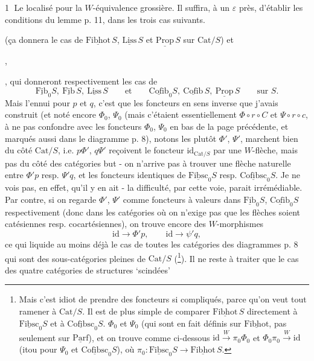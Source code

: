 \documentclass[11pt]{article}
\newcommand{\printedpage}[1]{\marginpar{\footnotesize p.~#1}}
\newcommand{\msp}[1]{\marginpar{\footnotesize [#1]}}
\newcommand{\Cat}{\mathrm{Cat}}
\newcommand{\uc}[1]{\underline{\mathrm{#1}}}
\begin{document}
\textcircled{1} Le localisé pour la $W$-équivalence grossière. Il suffira, à un $\varepsilon$ près, d'établir les conditions du lemme p. 11, dans les trois cas suivants.
(ça donnera le cas de $\uc{Fibhot}\,S$, $\uc{Liss}\,S$ et $\uc{Prop}\,S$ sur $\Cat/S$) et
,
,
qui donneront respectivement les cas de
\[
\uc{Fib}_0S,\ \uc{Fib}\,S,\ \uc{Liss}\,S \qquad \text{et} \qquad \uc{Cofib}_0S,\ \uc{Cofib}\,S,\ \uc{Prop}\,S \qquad \text{sur } S.
\]
Mais l'ennui pour $p$ et $q$, c'est que les foncteurs en sens inverse que j'avais construit (et noté encore $\Phi_0$, $\Psi_0$ (mais c'étaient essentiellement $\Phi\circ r\circ C$ et $\Psi\circ r\circ c$, à ne pas confondre avec les foncteurs $\Phi_0$, $\Psi_0$ en bas de la page précédente, et marqués aussi dans le diagramme p. 8), notons les plutôt $\Phi'$, $\Psi'$, marchent bien du côté $\Cat/S$, i.e. $p\Phi'$, $q\Psi'$ reçoivent le foncteur $\mathrm{id}_{\Cat/S}$ par une $W$-flèche, mais pas du côté des catégories but - on n'arrive pas à trouver une flèche naturelle entre $\Phi'p$ resp. $\Psi'q$, et les foncteurs identiques de $\uc{Fibsc}_0S$ resp. $\uc{Cofibsc}_0S$. Je ne vois
\msp{page 53}
pas, en effet, qu'il y en ait - la difficulté, par cette voie, parait irrémédiable. Par contre, si on regarde $\Phi'$, $\Psi'$ comme foncteurs à valeurs dans $\uc{Fib}_0S$, $\uc{Cofib}_0S$ respectivement (donc dans les catégories où on n'exige pas que les flèches soient catésiennes resp. cocartésiennes), on trouve encore des $W$-morphismes %
\[
\mathrm{id} \longrightarrow \Phi'p, \qquad \mathrm{id} \longrightarrow \psi'q, %
\]
ce qui liquide au moins déjà le cas de toutes les catégories des diagrammes p. 8 qui sont des
\printedpage{33}
sous-catégories pleines de $\Cat/S$ (\footnote[36]{Mais c'est idiot de prendre des foncteurs si compliqués, parce qu'on veut tout ramener à $\Cat/S$. Il est de plus simple de comparer $\uc{Fibhot}\,S$ directement à $\uc{Fibsc}_0S$ et à $\uc{Cofibsc}_0S$. $\Phi_0$ et $\Psi_0$ (qui sont en fait définis sur $\uc{Fibhot}$, pas seulement sur $\uc{Parf}$), et on trouve comme ci-dessous $\mathrm{id} \xrightarrow{W} \pi_0\Phi_0$ et $\Phi_0\pi_0 \xrightarrow{W} \mathrm{id}$ (itou pour $\Psi_0$ et $\uc{Cofibsc}_0S$), où $\pi_0 : \uc{Fibsc}_0S \longrightarrow \uc{Fibhot}\,S$.}). Il ne reste à traiter que le cas des quatre catégories de structures `scindées'
\end{document}
